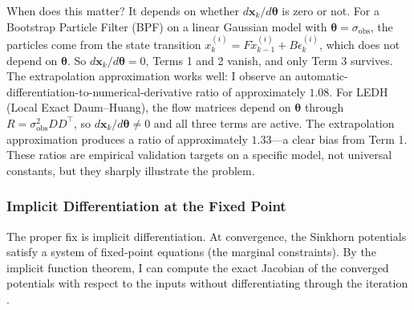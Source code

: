 \documentclass{article}
\renewcommand{\v}[1]{ \ensuremath{ {\mathbf{#1}} }}
\begin{document}
When does this matter? It depends on whether $d\mathbf{x}_k / d\v\theta$ is zero or not. For a Bootstrap Particle Filter (BPF) on a linear Gaussian model with $\v\theta = \sigma_{\mathrm{obs}}$, the particles come from the state transition $x_k^{(i)} = F \tilde{x}_{k-1}^{(i)} + B \epsilon_k^{(i)}$, which does not depend on $\v\theta$. So $d\mathbf{x}_k/d\v\theta = 0$, Terms 1 and 2 vanish, and only Term 3 survives. The extrapolation approximation works well: I observe an automatic-differentiation-to-numerical-derivative ratio of approximately $1.08$. For LEDH (Local Exact Daum--Huang), the flow matrices depend on $\v\theta$ through $R = \sigma_{\mathrm{obs}}^2 DD^\top$, so $d\mathbf{x}_k / d\v\theta \neq 0$ and all three terms are active. The extrapolation approximation produces a ratio of approximately $1.33$---a clear bias from Term 1. These ratios are empirical validation targets on a specific model, not universal constants, but they sharply illustrate the problem.

\subsubsection{Implicit Differentiation at the Fixed Point}

The proper fix is implicit differentiation. At convergence, the Sinkhorn potentials satisfy a system of fixed-point equations (the marginal constraints). By the implicit function theorem, I can compute the exact Jacobian of the converged potentials with respect to the inputs without differentiating through the iteration \cite{cremers2022unifiedframeworkimplicit}.
\end{document}
